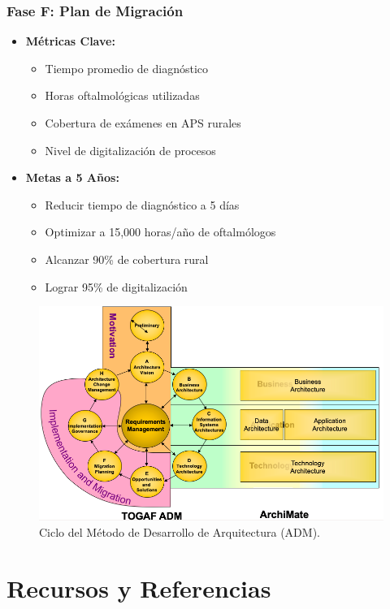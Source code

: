 \subsubsection{Fase F: Plan de Migración}
\begin{itemize}
\item \textbf{Métricas Clave:}
  \begin{itemize}
    \item Tiempo promedio de diagnóstico
    \item Horas oftalmológicas utilizadas
    \item Cobertura de exámenes en APS rurales
    \item Nivel de digitalización de procesos
  \end{itemize}
\item \textbf{Metas a 5 Años:}
  \begin{itemize}
    \item Reducir tiempo de diagnóstico a 5 días
    \item Optimizar a 15,000 horas/año de oftalmólogos
    \item Alcanzar 90\% de cobertura rural
    \item Lograr 95\% de digitalización
  \end{itemize}
\end{itemize}

\begin{figure}[h]
\centering
\includegraphics[scale=0.6]{Pictures/ADM.png}
\caption{Ciclo del Método de Desarrollo de Arquitectura (ADM).}
\label{fig:adm_phases}
\end{figure}




\section{Recursos y Referencias}

